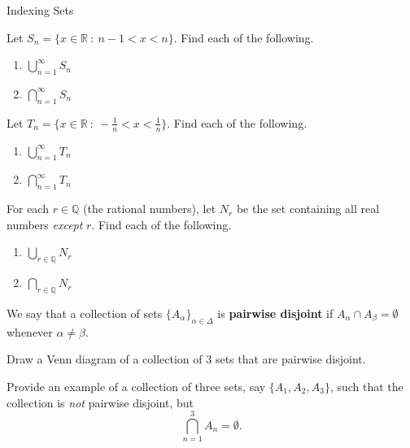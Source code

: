\begin{section}{Indexing Sets}
\begin{exercise}
Let $S_n = \{x \in \mathbb{R} \ : \ n-1<x<n \}$.  Find each of the following.
\begin{enumerate}
\item $\displaystyle \bigcup_{n=1}^{\infty}S_n$

\item $\displaystyle \bigcap_{n=1}^{\infty}S_n$
\end{enumerate}
\end{exercise}

\begin{exercise}
Let $T_n = \{x \in \mathbb{R} \ : \ -\frac{1}{n}<x< \frac{1}{n} \}$.  Find each of the following.
\begin{enumerate}
\item $\displaystyle \bigcup_{n=1}^{\infty}T_n$

\item $\displaystyle \bigcap_{n=1}^{\infty}T_n$
\end{enumerate}

\end{exercise}

\begin{exercise}
For each $r\in\mathbb{Q}$ (the rational numbers), let $N_r$ be the set containing all real numbers \emph{except} $r$.  Find each of the following.
\begin{enumerate}
\item $\displaystyle \bigcup_{r\in\mathbb{Q}}N_r$

\item $\displaystyle \bigcap_{r\in\mathbb{Q}}N_r$
\end{enumerate}

\end{exercise}

\begin{definition}
We say that a collection of sets $\{A_{\alpha}\}_{\alpha\in\Delta}$ is \textbf{pairwise disjoint} if $A_{\alpha} \cap A_{\beta}=\emptyset$ whenever $\alpha\neq \beta$.
\end{definition}

\begin{exercise}
Draw a Venn diagram of a collection of 3 sets that are pairwise disjoint.
\end{exercise}

\begin{exercise}
Provide an example of a collection of three sets, say $\{A_1, A_2, A_3\}$, such that the collection is \emph{not} pairwise disjoint, but 
\[
\bigcap_{n=1}^3 A_n=\emptyset.
\]
\end{exercise}


\end{section}
